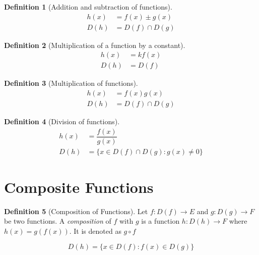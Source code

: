 \documentclass[fleqn]{article}
\theoremstyle{definition}
\newtheorem{definition}{Definition}
\theoremstyle{theorem}
\theoremstyle{remark}
\begin{document}
\begin{definition}[Addition and subtraction of functions]
	\begin{align}
		h(x) &= f(x) \pm g(x) \label{sum of functions}\\
		D(h) &= D(f) \cap D(g) \label{domain of sum of functions}
	\end{align}
\end{definition}

\begin{definition}[Multiplication of a function by a constant]
	\begin{align}
		h(x) &= k f(x) \label{product of constant and function}\\
		D(h) &= D(f)  \label{domain of product of constant and function}
	\end{align}
\end{definition}

\begin{definition}[Multiplication of functions]
	\begin{align}
		h(x) &= f(x) g(x) \label{product of functions}\\
		D(h) &= D(f) \cap D(g) \label{domain of product of functions}
	\end{align}
\end{definition}

\begin{definition}[Division of functions]
	\begin{align}
		h(x) &= \dfrac{f(x)}{g(x)} \label{division of functions}\\
		D(h) &= \{x \in D(f) \cap D(g) : g(x) \neq 0\} \label{domain of division of functions}
	\end{align}
\end{definition}

\section{Composite Functions}

\begin{definition}[Composition of Functions]
	Let $f : D(f) \rightarrow E$ and $g : D(g) \rightarrow F$ be two functions. A \emph{composition} of $f$ with $g$ is a function $h : D(h) \rightarrow F$ where $h(x) = g(f(x))$. It is denoted as $g \circ f$
\end{definition}
\begin{equation}
	D(h) = \{x \in D(f) : f(x) \in D(g)\} \label{domain of composite functions} 
\end{equation}
\end{document}
